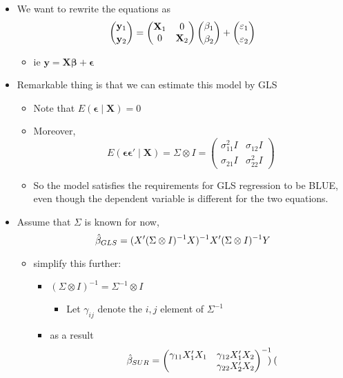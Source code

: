 \begin{itemize}[leftmargin=0pt]
\item We want to rewrite the equations as
       \[ \binom{\mathbf{y}_1}{\mathbf{y}_2} = \begin{pmatrix} \mathbf{X}_1
       & 0 \\ 0 & \mathbf{X}_2  \end{pmatrix}
       \binom{\beta_1}{\beta_2} +
      \binom{\mathbf{\varepsilon}_1}{\mathbf{\varepsilon}_2} \]
\begin{itemize}
\item ie $\mathbf{y} = \mathbf{X} \mathbf{\beta} + \mathbf{\epsilon}$
\end{itemize}
\item Remarkable thing is that we can estimate this model by GLS
\begin{itemize}
\item Note that $E(\mathbf{\epsilon} \mid \mathbf{X}) = 0$
\item Moreover,
  \[E(\mathbf{\epsilon} \mathbf{\epsilon}' \mid \mathbf{X}) = \Sigma \otimes I =
  \begin{pmatrix} \sigma^2_{11} I & \sigma_{12} I \\ \sigma_{21} I & \sigma^2_{22} I \end{pmatrix}\]
\item So the model satisfies the requirements for GLS regression to
         be BLUE, even though the dependent variable is different for
         the two equations.
\end{itemize}
\item Assume that $\Sigma$ is known for now, 
  \[\hat{\beta}_{GLS} = (X'(\Sigma \otimes I)^{-1}X)^{-1}X'(\Sigma \otimes I)^{-1}Y\]
\begin{itemize}
\item simplify this further:
\begin{itemize}
\item $(\Sigma \otimes I)^{-1} = \Sigma^{-1} \otimes I$
\begin{itemize}
\item Let $\gamma_{ij}$ denote the $i,j$ element of $\Sigma^{-1}$
\end{itemize}
\item as a result
  \[\hat{\beta}_{SUR} = \begin{pmatrix}
    \gamma_{11} X_1'X_1 & \gamma_{12} X_1'X_2 \\ & \gamma_{22} X_2'X_2 
  \end{pmatrix}^{-1} 
  \begin{pmatrix}

\end{pmatrix}\]
\end{itemize}
\end{itemize}
\end{itemize}
